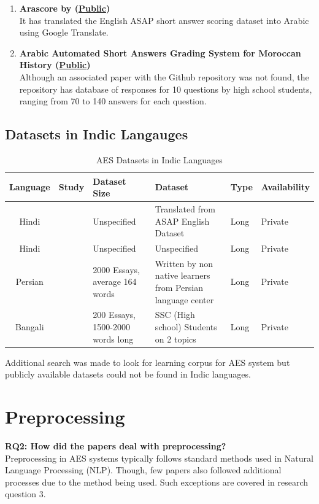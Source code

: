 \documentclass{article}
\begin{document}
\begin{enumerate}
    \item \textbf{Arascore by \textcite{nael2022arascore} (\href{https://github.com/abdelrahmanelnaka/AraScore-Dataset}{Public})} \\ It has translated the English ASAP short answer scoring dataset into Arabic using Google Translate.
    \item \textbf{Arabic Automated Short Answers Grading System for Moroccan History (\href{https://github.com/ahmed-bentajhamyani/grading-system}{Public})} \\ Although an associated paper with the Github repository was not found, the repository has database of responses for 10 questions by high school students, ranging from 70 to 140 answers for each question.
\end{enumerate}

\subsection*{Datasets in Indic Langauges}
\begin{table}[H]
    \centering
    \begin{tabularx}{6in}{|c|m{2cm}|X|p{1.5in}|p{1cm}|p{1.5cm}|}
    \hline
        Language & Study & Dataset Size & Dataset & Type & Availability \\ \hline
        Hindi & \textcite{10_singh2023hindi} & Unspecified & Translated from ASAP English Dataset & Long & Private \\ \hline
        Hindi & \textcite{11_walia2024hybrid} & Unspecified & Unspecified & Long & Private \\ \hline
        Persian & \textcite{9_firoozi2024bert} & 2000 Essays, average 164 words & Written by non native learners from Persian language center & Long & Private \\ \hline
        Bangali & \textcite{24_islam2013abess} & 200 Essays, 1500-2000 words long & SSC (High school) Students on 2 topics & Long & Private \\
        \hline
    \end{tabularx}
    \caption{AES Datasets in Indic Languages}
    \label{datasetindic}
\end{table}

Additional search was made to look for learning corpus for AES system but publicly available datasets could not be found in Indic languages.

\section{Preprocessing}
\textbf{RQ2: How did the papers deal with preprocessing?} \\
Preprocessing in AES systems typically follows standard methods used in Natural Language Processing (NLP). Though, few papers also followed additional processes due to the method being used. Such exceptions are covered in research question 3.
\end{document}
